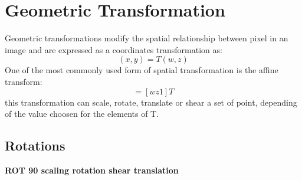 \section{Geometric Transformation}

Geometric transformations modify the spatial relationship between pixel in an image and are expressed as a coordinates transformation as:
\begin{equation}
	(x,y) = T{(w,z)}
\end{equation}
One of the most commonly used form of spatial transformation  is the affine transform:
\begin{equation}
	[x y 1] = [w z 1] T
\end{equation}
this transformation can scale, rotate, translate or shear a set of point, depending of the value choosen for the elements of T.

\subsection{Rotations}

{\bf ROT 90
scaling
rotation
shear
translation}
